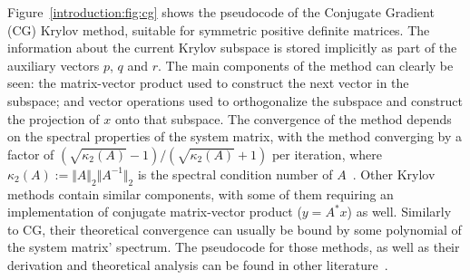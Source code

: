 Figure~\ref{introduction:fig:cg} shows the pseudocode of the Conjugate Gradient
(CG) Krylov method, suitable for symmetric positive definite matrices. The
information about the current Krylov subspace is stored implicitly as part of
the auxiliary vectors $p$, $q$ and $r$. The main components of the method can
clearly be seen: the matrix-vector product used to construct the next vector in
the subspace; and vector operations used to orthogonalize the subspace and
construct the projection of $x$ onto that subspace. The convergence of the
method depends on the spectral properties
of the system matrix, with the method
converging by a factor of $(\sqrt{\kappa_2(A)} - 1)/(\sqrt{\kappa_2(A)} + 1)$
per iteration, where $\kappa_2(A) := \Vert A \Vert_2 \Vert A^{-1} \Vert_2$ is
the spectral condition number   of
$A$~\cite{barrettemplates,demmel,saad}. Other Krylov methods contain similar
components, with some of them requiring an implementation of conjugate
matrix-vector product ($y = A^*x$) as well. Similarly to CG, their theoretical
convergence can usually be bound by some polynomial of the system matrix'
spectrum. The pseudocode for those methods, as well as their derivation and
theoretical analysis can be found in other
literature~\cite{barrettemplates,demmel,saad}.

